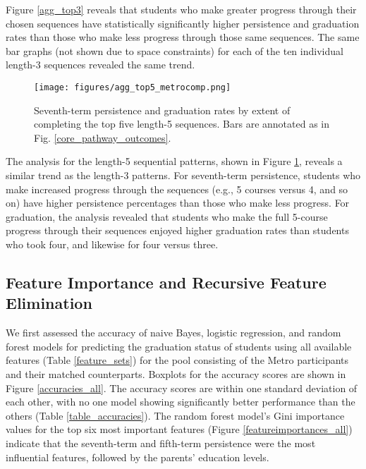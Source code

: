 \documentclass[conference]{IEEEtran}
\begin{document}
Figure \ref{agg_top3} reveals that students who make greater progress through their chosen sequences have statistically significantly higher persistence and graduation rates than those who make less progress through those same sequences.  The same bar graphs (not shown due to space constraints) for each of the ten individual length-3 sequences revealed the same trend.  %

\begin{figure}[htbp]
\texttt{[image: figures/agg\_top5\_metrocomp.png]}
\caption{Seventh-term persistence and graduation rates by extent of completing the top five length-5 sequences.  Bars are annotated as in Fig. \ref{core_pathway_outcomes}.}
\label{agg_top5}
\end{figure}

The analysis for the length-5 sequential patterns, shown in Figure \ref{agg_top5}, reveals a similar trend as the length-3 patterns. For seventh-term persistence, students who make increased progress through the sequences (e.g., 5 courses versus 4, and so on) have higher persistence percentages than those who make less progress.  For graduation, the analysis revealed that students who make the full 5-course progress through their sequences enjoyed higher graduation rates than students who took four, and likewise for four versus three. %

\subsection{Feature Importance and Recursive Feature Elimination}
We first assessed the accuracy of naive Bayes, logistic regression, and random forest models for predicting the graduation status of students using all available features (Table \ref{feature_sets}) for the pool consisting of the Metro participants and their matched counterparts.  Boxplots for the accuracy scores are shown in Figure \ref{accuracies_all}.  The accuracy scores are within one standard deviation of each other, with no one model showing significantly better performance than the others (Table \ref{table_accuracies}).  The random forest model's Gini importance values for the top six most important features (Figure \ref{featureimportances_all}) indicate that the seventh-term and fifth-term persistence were the most influential features, followed by the parents' education levels.   
\end{document}
